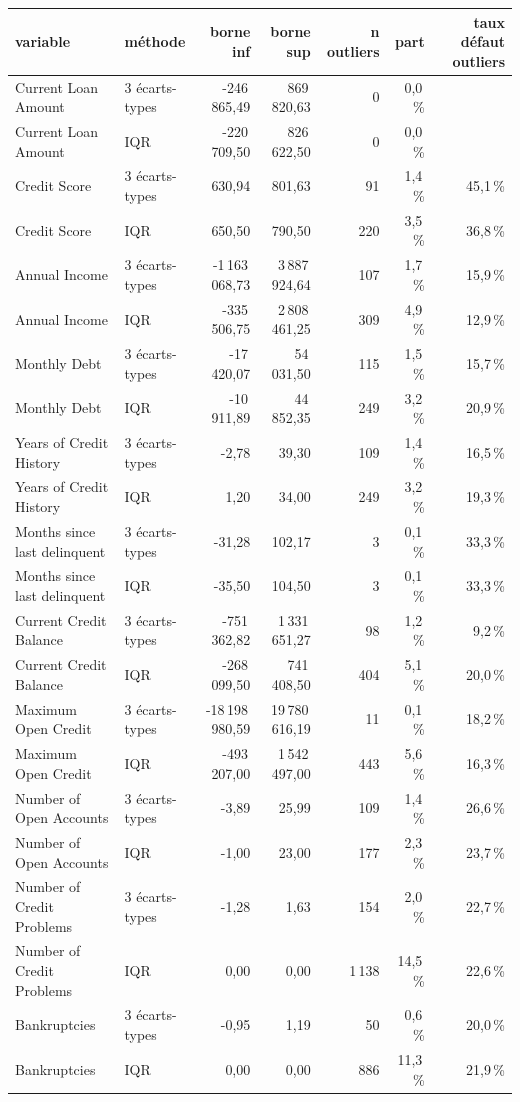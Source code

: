 \begin{tabular}{llrrrrr}
\toprule
\textbf{variable} & \textbf{méthode} & \textbf{borne inf} & \textbf{borne sup} & \textbf{n outliers} & \textbf{part} & \textbf{taux défaut outliers} \\
\midrule
Current Loan Amount & 3 écarts-types & -246\,865,49 & 869\,820,63 & 0 & 0,0\,\% &  \\
Current Loan Amount & IQR & -220\,709,50 & 826\,622,50 & 0 & 0,0\,\% &  \\
Credit Score & 3 écarts-types & 630,94 & 801,63 & 91 & 1,4\,\% & 45,1\,\% \\
Credit Score & IQR & 650,50 & 790,50 & 220 & 3,5\,\% & 36,8\,\% \\
Annual Income & 3 écarts-types & -1\,163\,068,73 & 3\,887\,924,64 & 107 & 1,7\,\% & 15,9\,\% \\
Annual Income & IQR & -335\,506,75 & 2\,808\,461,25 & 309 & 4,9\,\% & 12,9\,\% \\
Monthly Debt & 3 écarts-types & -17\,420,07 & 54\,031,50 & 115 & 1,5\,\% & 15,7\,\% \\
Monthly Debt & IQR & -10\,911,89 & 44\,852,35 & 249 & 3,2\,\% & 20,9\,\% \\
Years of Credit History & 3 écarts-types & -2,78 & 39,30 & 109 & 1,4\,\% & 16,5\,\% \\
Years of Credit History & IQR & 1,20 & 34,00 & 249 & 3,2\,\% & 19,3\,\% \\
Months since last delinquent & 3 écarts-types & -31,28 & 102,17 & 3 & 0,1\,\% & 33,3\,\% \\
Months since last delinquent & IQR & -35,50 & 104,50 & 3 & 0,1\,\% & 33,3\,\% \\
Current Credit Balance & 3 écarts-types & -751\,362,82 & 1\,331\,651,27 & 98 & 1,2\,\% & 9,2\,\% \\
Current Credit Balance & IQR & -268\,099,50 & 741\,408,50 & 404 & 5,1\,\% & 20,0\,\% \\
Maximum Open Credit & 3 écarts-types & -18\,198\,980,59 & 19\,780\,616,19 & 11 & 0,1\,\% & 18,2\,\% \\
Maximum Open Credit & IQR & -493\,207,00 & 1\,542\,497,00 & 443 & 5,6\,\% & 16,3\,\% \\
Number of Open Accounts & 3 écarts-types & -3,89 & 25,99 & 109 & 1,4\,\% & 26,6\,\% \\
Number of Open Accounts & IQR & -1,00 & 23,00 & 177 & 2,3\,\% & 23,7\,\% \\
Number of Credit Problems & 3 écarts-types & -1,28 & 1,63 & 154 & 2,0\,\% & 22,7\,\% \\
Number of Credit Problems & IQR & 0,00 & 0,00 & 1\,138 & 14,5\,\% & 22,6\,\% \\
Bankruptcies & 3 écarts-types & -0,95 & 1,19 & 50 & 0,6\,\% & 20,0\,\% \\
Bankruptcies & IQR & 0,00 & 0,00 & 886 & 11,3\,\% & 21,9\,\% \\
\bottomrule
\end{tabular}
